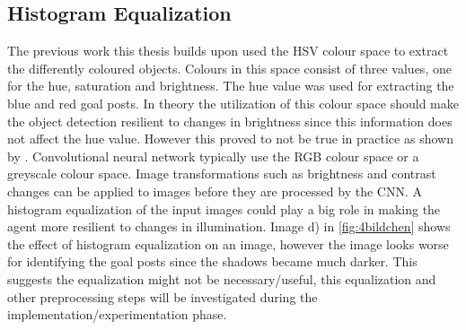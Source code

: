 \subsection{Histogram Equalization}

The previous work this thesis builds upon used the HSV colour space to extract the differently coloured objects. Colours in this space consist of three values, one for the hue, saturation and brightness. The hue value was used for extracting the blue and red goal posts. In theory the utilization of this colour space should make the object detection resilient to changes in brightness since this information does not affect the hue value. However this proved to not be true in practice as shown by \autocite{maximilian}.
Convolutional neural network typically use the RGB colour space or a greyscale colour space. Image transformations such as brightness and contrast changes can be applied to images before they are processed by the CNN. A histogram equalization of the input images could play a big role in making the agent more resilient to changes in illumination. Image d) in \ref{fig:4bildchen} shows the effect of histogram equalization on an image, however the image looks worse for identifying the goal posts since the shadows became much darker. This suggests the equalization might not be necessary/useful, this equalization and other preprocessing steps will be investigated during the implementation/experimentation phase.




